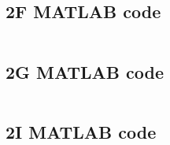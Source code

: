 \subsection{2F MATLAB code}
\label{apx:2F_matlab}
\inputminted[breaklines]{Matlab}{./Code/Task2F.m}

\subsection{2G MATLAB code}
\label{apx:2G_matlab}
\inputminted[breaklines]{Matlab}{./Code/Task2G.m}

\subsection{2I MATLAB code}
\label{apx:2I_matlab}
\inputminted[breaklines]{Matlab}{./Code/Task2I.m}